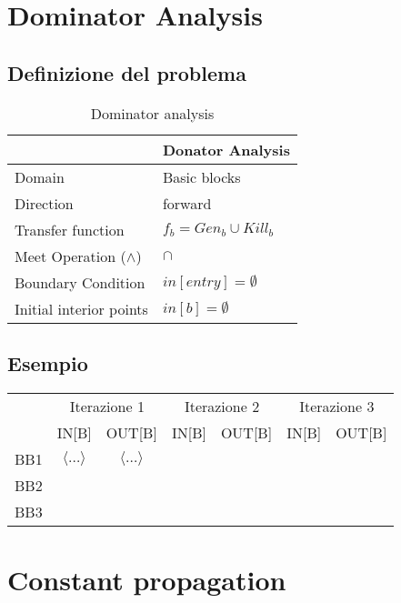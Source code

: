 \documentclass[10pt,a4paper]{article}
\begin{document}
\section{Dominator Analysis}
\subsection{Definizione del problema}
\begin{table}[h!]
  \centering
  \begin{tabular}{|l|p{4cm}|}
    \hline
    \textbf{} & \textbf{Donator Analysis} \\
    \hline
    Domain & Basic blocks\\
    \hline
    Direction & forward\\
    \hline
    Transfer function & $f_b = Gen_b \cup Kill_b$\\
    \hline
    Meet Operation (\(\land\)) & $\cap$ \\
    \hline
    Boundary Condition & $in[entry] = \emptyset $\\
    \hline
    Initial interior points & $in[b] = \emptyset $ \\
    \hline
  \end{tabular}
  \caption{Dominator analysis}
\end{table}

\subsection{Esempio}
\begin{table}[h!]
\centering
\renewcommand{\arraystretch}{1.5}
\begin{tabular}{|c|c|c|c|c|c|c|}
\hline
\rowcolor{blue!30}
 & \multicolumn{2}{c|}{Iterazione 1} & \multicolumn{2}{c|}{Iterazione 2} & \multicolumn{2}{c|}{Iterazione 3} \\
\rowcolor{blue!30}
 & IN[B] & OUT[B] & IN[B] & OUT[B] & IN[B] & OUT[B] \\
\hline
BB1 & $\langle \ldots \rangle$ & $\langle \ldots \rangle$ & & & & \\
\hline
BB2 & & & & & & \\
\hline
BB3 & & & & & & \\
\hline
\end{tabular}
\end{table}


\section{Constant propagation}
\end{document}
